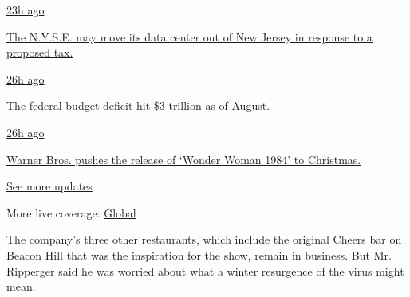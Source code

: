 \href{https://www.nytimes3xbfgragh.onion/live/2020/09/11/business/stock-market-today-coronavirus?action=click\&pgtype=Article\&state=default\&region=MAIN_CONTENT_1\&context=storylines_live_updates\#the-nyse-may-move-its-data-center-out-of-new-jersey-in-response-to-a-proposed-tax}{23h
ago}

\href{https://www.nytimes3xbfgragh.onion/live/2020/09/11/business/stock-market-today-coronavirus?action=click\&pgtype=Article\&state=default\&region=MAIN_CONTENT_1\&context=storylines_live_updates\#the-nyse-may-move-its-data-center-out-of-new-jersey-in-response-to-a-proposed-tax}{The
N.Y.S.E. may move its data center out of New Jersey in response to a
proposed tax.}

\href{https://www.nytimes3xbfgragh.onion/live/2020/09/11/business/stock-market-today-coronavirus?action=click\&pgtype=Article\&state=default\&region=MAIN_CONTENT_1\&context=storylines_live_updates\#the-federal-budget-deficit-hit-3-trillion-as-of-august}{26h
ago}

\href{https://www.nytimes3xbfgragh.onion/live/2020/09/11/business/stock-market-today-coronavirus?action=click\&pgtype=Article\&state=default\&region=MAIN_CONTENT_1\&context=storylines_live_updates\#the-federal-budget-deficit-hit-3-trillion-as-of-august}{The
federal budget deficit hit \$3 trillion as of August.}

\href{https://www.nytimes3xbfgragh.onion/live/2020/09/11/business/stock-market-today-coronavirus?action=click\&pgtype=Article\&state=default\&region=MAIN_CONTENT_1\&context=storylines_live_updates\#warner-bros-pushes-the-release-of-wonder-woman-1984-to-christmas}{26h
ago}

\href{https://www.nytimes3xbfgragh.onion/live/2020/09/11/business/stock-market-today-coronavirus?action=click\&pgtype=Article\&state=default\&region=MAIN_CONTENT_1\&context=storylines_live_updates\#warner-bros-pushes-the-release-of-wonder-woman-1984-to-christmas}{Warner
Bros. pushes the release of `Wonder Woman 1984' to Christmas.}

\href{https://www.nytimes3xbfgragh.onion/live/2020/09/11/business/stock-market-today-coronavirus?action=click\&pgtype=Article\&state=default\&region=MAIN_CONTENT_1\&context=storylines_live_updates}{See
more updates}

More live coverage:
\href{https://www.nytimes3xbfgragh.onion/2020/09/11/world/covid-19-coronavirus.html?action=click\&pgtype=Article\&state=default\&region=MAIN_CONTENT_1\&context=storylines_live_updates}{Global}

The company's three other restaurants, which include the original Cheers
bar on Beacon Hill that was the inspiration for the show, remain in
business. But Mr. Ripperger said he was worried about what a winter
resurgence of the virus might mean.

